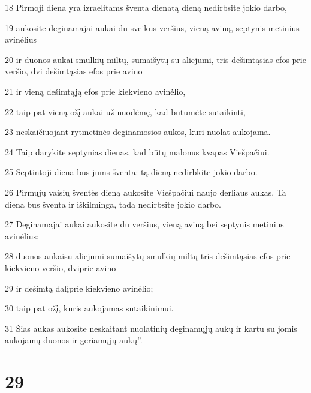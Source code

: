 \par 18 Pirmoji diena yra izraelitams šventa diena­tą dieną nedirbsite jokio darbo, 
\par 19 aukosite deginamajai aukai du sveikus veršius, vieną aviną, septynis metinius avinėlius 
\par 20 ir duonos aukai smulkių miltų, sumaišytų su aliejumi, tris dešimtąsias efos prie veršio, dvi dešimtąsias efos prie avino 
\par 21 ir vieną dešimtąją efos prie kiekvieno avinėlio, 
\par 22 taip pat vieną ožį aukai už nuodėmę, kad būtumėte sutaikinti, 
\par 23 neskaičiuojant rytmetinės deginamosios aukos, kuri nuolat aukojama. 
\par 24 Taip darykite septynias dienas, kad būtų malonus kvapas Viešpačiui. 
\par 25 Septintoji diena bus jums šventa: tą dieną nedirbkite jokio darbo. 
\par 26 Pirmųjų vaisių šventės dieną aukosite Viešpačiui naujo derliaus aukas. Ta diena bus šventa ir iškilminga, tada nedirbsite jokio darbo. 
\par 27 Deginamajai aukai aukosite du veršius, vieną aviną bei septynis metinius avinėlius; 
\par 28 duonos aukai­su aliejumi sumaišytų smulkių miltų tris dešimtąsias efos prie kiekvieno veršio, dvi­prie avino 
\par 29 ir dešimtą dalį­prie kiekvieno avinėlio; 
\par 30 taip pat ožį, kuris aukojamas sutaikinimui. 
\par 31 Šias aukas aukosite neskaitant nuolatinių deginamųjų aukų ir kartu su jomis aukojamų duonos ir geriamųjų aukų”.



\chapter{29}


